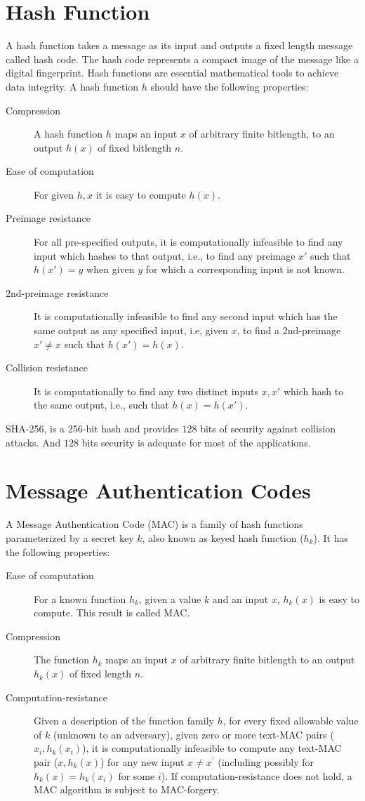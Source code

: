 \section{Hash Function}
	A hash function takes a message as its input and outputs a fixed length message called hash code.
	The hash code represents a compact image of the message like a digital fingerprint.
	Hash functions are essential mathematical tools to achieve data integrity.
	A hash function $h$ should have the following properties:
	\begin{description}
		\item [Compression] A hash function $h$ maps an input $x$ of arbitrary finite bitlength, to an output $h(x)$ of fixed bitlength $n$.
		\item [Ease of computation] For given $h,x$ it is easy to compute $h(x)$.
		\item [Preimage resistance] For all pre-specified outputs, it is computationally infeasible to find any input which hashes to that output, i.e., to find any preimage $x'$ such that $h(x') = y$ when given $y$ for which a corresponding input is not known.
		\item [2nd-preimage resistance] It is computationally infeasible to find any second input which has the same output as any specified input, i.e, given $x$, to find a 2nd-preimage $x' \neq x$ such that $h(x') = h(x)$.
		\item [Collision resistance] It is computationally to find any two distinct inputs $x,x'$ which hash to the same output, i.e., such that $h(x) = h(x')$.
	\end{description}
	SHA-256, is a 256-bit hash and provides $128$ bits of security against collision attacks\cite{SHA256}.
	And $128$ bits security is adequate for most of the applications.

\section{Message Authentication Codes}
	A Message Authentication Code (MAC) is a family of hash functions parameterized by a secret key $k$, also known as keyed hash function ($h_{k}$).
	It has the following properties:
	\begin{description}
		\item [Ease of computation] For a known function $h_{k}$, given a value $k$
		and an input $x$, $h_{k}(x)$ is easy to compute.
		This result is called MAC.
		\item [Compression] The function $h_{k}$ maps an input $x$ of arbitrary finite bitlength to an output $h_{k}(x)$ of fixed length $n$.  
		\item [Computation-resistance] Given a description of the function family $h$, for every fixed allowable value of $k$ (unknown to an adversary), given zero or more text-MAC pairs ($x_{i}, h_{k}(x_{i})$), it is computationally infeasible to compute any text-MAC pair ($x,h_{k}(x)$) for any new input $x \neq x^{'}$ (including possibly for $h_{k}(x) = h_{k}(x_{i})$ for some $i$). 
	If computation-resistance does not hold, a MAC algorithm is subject to MAC-forgery.
	\end{description}

